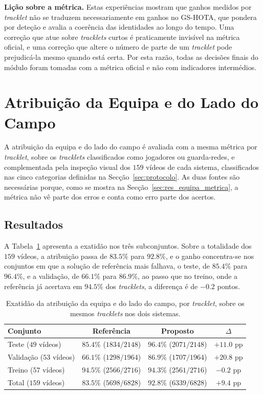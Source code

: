 \medskip\noindent\textbf{Lição sobre a métrica.} Estas experiências mostram que ganhos medidos por \emph{tracklet} não se traduzem necessariamente em ganhos no GS-HOTA, que pondera por deteção e avalia a coerência das identidades ao longo do tempo. Uma correção que atue sobre \emph{tracklets} curtos é praticamente invisível na métrica oficial, e uma correção que altere o número de parte de um \emph{tracklet} pode prejudicá-la mesmo quando está certa. Por esta razão, todas as decisões finais do módulo foram tomadas com a métrica oficial e não com indicadores intermédios.

\section{Atribuição da Equipa e do Lado do Campo}\label{sec:res_equipa}

A atribuição da equipa e do lado do campo é avaliada com a mesma métrica por \emph{tracklet}, sobre os \emph{tracklets} classificados como jogadores ou guarda-redes, e complementada pela inspeção visual dos $159$ vídeos de cada sistema, classificados nas cinco categorias definidas na Secção~\ref{sec:protocolo}. As duas fontes são necessárias porque, como se mostra na Secção~\ref{sec:res_equipa_metrica}, a métrica não vê parte dos erros e conta como erro parte dos acertos.

\subsection{Resultados}\label{sec:res_equipa_resultados}

A Tabela~\ref{tab:team-conjuntos} apresenta a exatidão nos três subconjuntos. Sobre a totalidade dos $159$ vídeos, a atribuição passa de $83.5\%$ para $92.8\%$, e o ganho concentra-se nos conjuntos em que a solução de referência mais falhava, o teste, de $85.4\%$ para $96.4\%$, e a validação, de $66.1\%$ para $86.9\%$, ao passo que no treino, onde a referência já acertava em $94.5\%$ dos \emph{tracklets}, a diferença é de $-0.2$ pontos.

\begin{table}[htbp]
    \centering
    \caption{Exatidão da atribuição da equipa e do lado do campo, por \emph{tracklet}, sobre os mesmos \emph{tracklets} nos dois sistemas.}
    \label{tab:team-conjuntos}
    \begin{tabular}{|l|c|c|c|}
        \hline
        \textbf{Conjunto} & \textbf{Referência} & \textbf{Proposto} & \textbf{$\Delta$} \\
        \hline
        Teste ($49$ vídeos)     & $85.4\%$ ($1834/2148$)   & $96.4\%$ ($2071/2148$)   & $+11.0$ pp \\
        \hline
        Validação ($53$ vídeos) & $66.1\%$ ($1298/1964$) & $86.9\%$ ($1707/1964$) & $+20.8$ pp \\
        \hline
        Treino ($57$ vídeos)    & $94.5\%$ ($2566/2716$) & $94.3\%$ ($2561/2716$) & $-0.2$ pp \\
        \hline
        Total ($159$ vídeos)    & $83.5\%$ ($5698/6828$)     & $92.8\%$ ($6339/6828$)     & $+9.4$ pp \\
        \hline
    \end{tabular}
\end{table}

